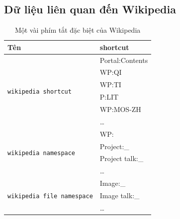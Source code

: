\subsection*{Dữ liệu liên quan đến Wikipedia}
\begin{table}[htb]
    \centering
    \caption{Một vài phím tắt đặc biệt của Wikipedia}
    \label{table:wikipedia-shortcuts}
    \begin{tabular}{l l}
        \toprule
        \textbf{Tên}                                                    & \textbf{shortcut} \\\midrule
        \multirow{6}{*}{\texttt{wikipedia shortcut\footnotemark}}       & Portal:Contents   \\
                                                                        & WP:QI             \\
                                                                        & WP:TI             \\
                                                                        & P:LIT             \\
                                                                        & WP:MOS-ZH         \\
                                                                        & \dots             \\\midrule
        \multirow{4}{*}{\texttt{wikipedia namespace\footnotemark}}      & WP:\              \\
                                                                        & Project:\_        \\
                                                                        & Project talk:\_   \\
                                                                        & \dots             \\\midrule
        \multirow{3}{*}{\texttt{wikipedia file namespace\footnotemark}} & Image:\_          \\
                                                                        & Image talk:\_     \\
                                                                        & \dots             \\
        \bottomrule
    \end{tabular}
\end{table}


